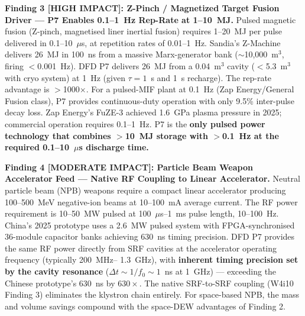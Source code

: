 \documentclass[11pt]{article}
\begin{document}
\begin{tcolorbox}[colback=blue!5!white, colframe=blue!60!black,
  title=\textbf{W4i13 P7 --- Top 5 Findings (Ranked by Impact)}]
\textbf{Finding 3 [HIGH IMPACT]: Z-Pinch / Magnetized Target Fusion Driver --- P7 Enables 0.1--1~Hz Rep-Rate at 1--10~MJ.}
Pulsed magnetic fusion (Z-pinch, magnetised liner inertial fusion) requires
1--20~MJ per pulse delivered in 0.1--10~$\mu$s, at repetition rates of
0.01--1~Hz. Sandia's Z-Machine delivers 26~MJ in 100~ns from a
massive Marx-generator bank ($\sim$10,000~m$^3$, firing $<$0.001~Hz).
DFD P7 delivers 26~MJ from a 0.04~m$^3$ cavity ($<$5.3~m$^3$ with
cryo system) at 1~Hz (given $\tau = 1$~s and 1~s recharge). The rep-rate
advantage is $>$1000$\times$. For a pulsed-MIF plant at 0.1~Hz
(Zap Energy/General Fusion class), P7 provides continuous-duty operation
with only 9.5\% inter-pulse decay loss. Zap Energy's FuZE-3 achieved
1.6~GPa plasma pressure in 2025; commercial operation requires 0.1--1~Hz.
P7 is the \textbf{only pulsed power technology that combines $>$10~MJ
storage with $>$0.1~Hz at the required 0.1--10~$\mu$s discharge time.}

\textbf{Finding 4 [MODERATE IMPACT]: Particle Beam Weapon Accelerator Feed --- Native RF Coupling to Linear Accelerator.}
Neutral particle beam (NPB) weapons require a compact linear accelerator
producing 100--500~MeV negative-ion beams at 10--100~mA average current.
The RF power requirement is 10--50~MW pulsed at 100~$\mu$s--1~ms pulse
length, 10--100~Hz. China's 2025 prototype uses a 2.6~MW pulsed system
with FPGA-synchronised 36-module capacitor banks achieving 630~ns
timing precision. DFD P7 provides the same RF power directly from
SRF cavities at the accelerator operating frequency (typically 200~MHz--
1.3~GHz), with \textbf{inherent timing precision set by the cavity
resonance} ($\Delta t \sim 1/f_0 \sim 1$~ns at 1~GHz) --- exceeding
the Chinese prototype's 630~ns by $630\times$. The native SRF-to-SRF
coupling (W4i10 Finding 3) eliminates the klystron chain entirely.
For space-based NPB, the mass and volume savings compound with the
space-DEW advantages of Finding 2.


\end{tcolorbox}
\end{document}
